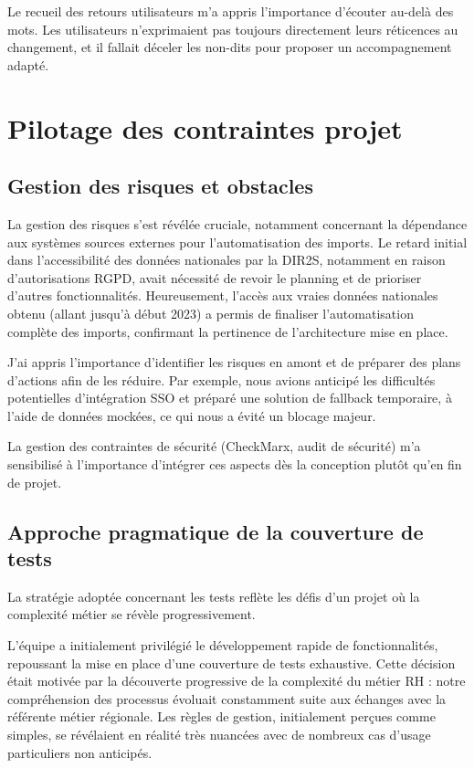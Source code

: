 Le recueil des retours utilisateurs m'a appris l'importance d'écouter au-delà des mots.
Les utilisateurs n'exprimaient pas toujours directement leurs réticences au changement, et il fallait déceler les non-dits pour proposer un accompagnement adapté.


\section{Pilotage des contraintes projet}

\subsection{Gestion des risques et obstacles}
La gestion des risques s'est révélée cruciale, notamment concernant la dépendance aux systèmes sources externes pour l'automatisation des imports.
Le retard initial dans l'accessibilité des données nationales par la DIR2S, notamment en raison d'autorisations RGPD, avait nécessité de revoir le planning et de prioriser d'autres fonctionnalités. Heureusement, l'accès aux vraies données nationales obtenu (allant jusqu'à début 2023) a permis de finaliser l'automatisation complète des imports, confirmant la pertinence de l'architecture mise en place.

J'ai appris l'importance d'identifier les risques en amont et de préparer des plans d'actions afin de les réduire.
Par exemple, nous avions anticipé les difficultés potentielles d'intégration SSO et préparé une solution de fallback temporaire, à l'aide de données mockées, ce qui nous a évité un blocage majeur.

La gestion des contraintes de sécurité (CheckMarx, audit de sécurité) m'a sensibilisé à l'importance d'intégrer ces aspects dès la conception plutôt qu'en fin de projet.

\subsection{Approche pragmatique de la couverture de tests}
La stratégie adoptée concernant les tests reflète les défis d'un projet où la complexité métier se révèle progressivement.

L'équipe a initialement privilégié le développement rapide de fonctionnalités, repoussant la mise en place d'une couverture de tests exhaustive. Cette décision était motivée par la découverte progressive de la complexité du métier RH : notre compréhension des processus évoluait constamment suite aux échanges avec la référente métier régionale. Les règles de gestion, initialement perçues comme simples, se révélaient en réalité très nuancées avec de nombreux cas d'usage particuliers non anticipés.

